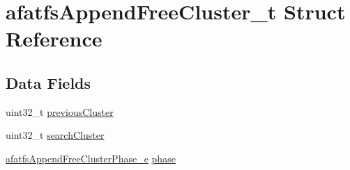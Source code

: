 \hypertarget{structafatfsAppendFreeCluster__t}{\section{afatfs\+Append\+Free\+Cluster\+\_\+t Struct Reference}
\label{structafatfsAppendFreeCluster__t}
}
\subsection*{Data Fields}
\begin{DoxyCompactItemize}
\item 
uint32\+\_\+t \hyperlink{structafatfsAppendFreeCluster__t_aa7b1aa19502059e683f0c11d23029ea1}{previous\+Cluster}
\item 
uint32\+\_\+t \hyperlink{structafatfsAppendFreeCluster__t_ac2acf292e95aa0c3f03bd3577442cedd}{search\+Cluster}
\item 
\hyperlink{asyncfatfs_8c_a480ab025f365851d29e86c2311667e5e}{afatfs\+Append\+Free\+Cluster\+Phase\+\_\+e} \hyperlink{structafatfsAppendFreeCluster__t_ac465900d9a2fdbc1eb668bf3fd86ee21}{phase}
\end{DoxyCompactItemize}


